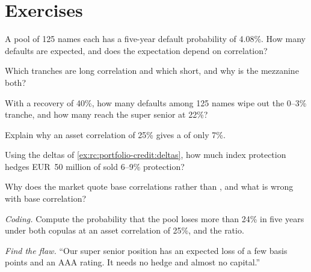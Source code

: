 \section{Exercises}

\begin{exercise}[$\star$]\label{exo:rc:portfolio-credit:1}
A pool of 125 names each has a five-year default probability of 4.08\%. How many defaults
are expected, and does the expectation depend on correlation?
\end{exercise}

\begin{exercise}[$\star$]\label{exo:rc:portfolio-credit:2}
Which tranches are long correlation and which short, and why is the mezzanine both?
\end{exercise}

\begin{exercise}[$\star$]\label{exo:rc:portfolio-credit:3}
With a recovery of 40\%, how many defaults among 125 names wipe out the 0--3\% tranche,
and how many reach the super senior at 22\%?
\end{exercise}

\begin{exercise}[$\star\star$]\label{exo:rc:portfolio-credit:4}
Explain why an asset correlation of 25\% gives a  of only 7\%.
\end{exercise}

\begin{exercise}[$\star\star$]\label{exo:rc:portfolio-credit:5}
Using the deltas of \cref{ex:rc:portfolio-credit:deltas}, how much index protection hedges
EUR~50 million of sold 6--9\% protection?
\end{exercise}

\begin{exercise}[$\star\star$]\label{exo:rc:portfolio-credit:6}
Why does the market quote base correlations rather than , and
what is wrong with base correlation?
\end{exercise}

\begin{exercise}[$\star\star\star$]\label{exo:rc:portfolio-credit:7}
\emph{Coding.} Compute the probability that the pool loses more than 24\% in five years under
both copulas at an asset correlation of 25\%, and the ratio.
\end{exercise}

\begin{exercise}[$\star\star\star$]\label{exo:rc:portfolio-credit:8}
\emph{Find the flaw.} ``Our super senior position has an expected loss of a few basis points
and an AAA rating. It needs no hedge and almost no capital.''
\end{exercise}

